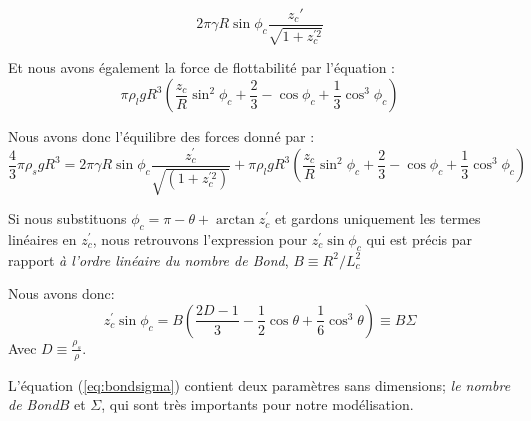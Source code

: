     \begin{equation}
        2\pi\gamma R\sin{\phi_c}\frac{z_c'}{\sqrt{1+z_c^{'2}}}
        \label{eq:tensionSuperficielle}
    \end{equation}

    Et nous avons également la force de flottabilité par l'équation :
    \begin{equation}
        \pi\rho_l g R^3 (\frac{z_c}{R}\sin^2{\phi_c} + \frac{2}{3}-\cos{\phi_c}+\frac{1}{3}\cos^3{\phi_c})
        \label{eq:buoyancyForce}
    \end{equation}


    Nous avons donc l'équilibre des forces donné par :
    \begin{equation}
        \frac{4}{3}\pi\rho_{s}gR^3 =2\pi\gamma R \sin\phi_c \frac{z_c^{'}}{\sqrt{(1+z_c^{'2})}} + \pi\rho_l g R^3 (\frac{z_c}{R}\sin^2 \phi_c + \frac{2}{3}-\cos\phi_c+\frac{1}{3}\cos^3 \phi_c)
        \label{eq:BalanceOfForces}
    \end{equation}


    Si nous substituons \(\phi_c = \pi - \theta + \arctan z_c^{'}\) et gardons uniquement les termes linéaires en \(z_c^{'}\), nous retrouvons l'expression pour \(z_c^{'}\sin \phi_c\) qui est précis par rapport \textit{à l'ordre linéaire du nombre de Bond}, \(B \equiv R^2/L_c^2\) 

    Nous avons donc:
    \begin{equation}
        z_c^{'}\sin \phi_c = B(\frac{2D-1}{3}-\frac{1}{2}\cos \theta + \frac{1}{6} \cos^3 \theta) \equiv B\Sigma
        \label{eq:bondsigma}
    \end{equation}
    Avec \(D \equiv \frac{\rho_s}{\rho}\).
    

    L'équation (\ref{eq:bondsigma}) contient deux paramètres sans dimensions; \textit{le nombre de Bond}$B$ et $\Sigma$, qui sont très importants pour notre modélisation.

